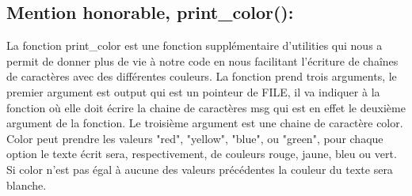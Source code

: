 \documentclass[12pt,francais]{article}
\begin{document}
\subsection{Mention honorable, print\_color():}
	La fonction print\_color est une fonction supplémentaire d'utilities qui nous a permit de donner plus de vie à notre code en nous facilitant l'écriture de chaînes de caractères avec des différentes couleurs. La fonction prend trois arguments, le premier argument est output qui est un pointeur de FILE, il va indiquer à la fonction où elle doit écrire la chaine de caractères msg qui est en effet le deuxième argument de la fonction. Le troisième argument est une chaine de caractère color. Color peut prendre les valeurs "red", "yellow", "blue", ou "green", pour chaque option le texte écrit sera, respectivement, de couleurs rouge, jaune, bleu ou vert. Si color n'est pas égal à aucune des valeurs précédentes la couleur du texte sera blanche.
\end{document}
